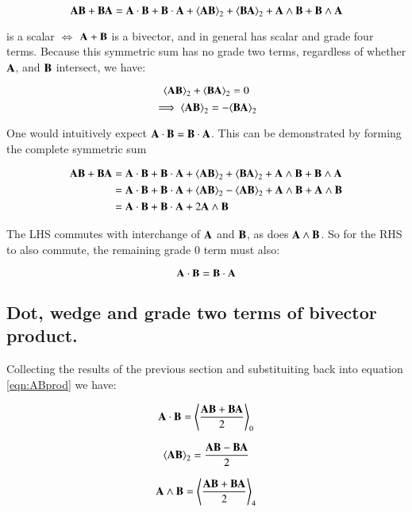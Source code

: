 \documentclass{article}      %
\newcommand{\gpgrade}[2] {{\left\langle{{#1}}\right\rangle}_{#2}}
\newcommand{\gpgradetwo}[1] {\gpgrade{#1}{2}}
\begin{document}
\[
\BA \BB + \BB \BA = 
\BA \cdot \BB + \BB \cdot \BA
+\gpgradetwo{\BA \BB} + \gpgradetwo{\BB \BA}
+\BA \wedge \BB + \BB \wedge \BA
\]

is a scalar $\iff$ 
$\mathbf{A} + \mathbf{B}$ is a bivector, and in general has scalar and grade four terms.
Because this symmetric sum has no grade two terms, 
regardless of whether $\mathbf{A}$, and $\mathbf{B}$ intersect, we have:

\[
\gpgradetwo{\BA \BB} + \gpgradetwo{\BB \BA} = 0
\]
\begin{equation}\label{eqn:signgradetwo}
\implies
\gpgradetwo{\BA \BB} = -\gpgradetwo{\BB \BA}
\end{equation}

One would intuitively expect $\mathbf{A} \cdot \mathbf{B} = \mathbf{B} \cdot \mathbf{A}$.  This can be
demonstrated by forming the complete symmetric sum

\begin{align*}
\BA \BB + \BB \BA 
&= 
{\BA \cdot \BB} +{\BB \cdot \BA}
+\gpgrade{\BA \BB}{2} +\gpgrade{\BB \BA}{2}
+{\BA \wedge \BB} + {\BB \wedge \BA} \\
&= 
{\BA \cdot \BB} +{\BB \cdot \BA}
+\gpgrade{\BA \BB}{2} -\gpgrade{\BA \BB}{2}
+{\BA \wedge \BB} + {\BA \wedge \BB} \\
&= 
{\BA \cdot \BB} +{\BB \cdot \BA}
+2{\BA \wedge \BB} \\
\end{align*}

The LHS commutes with interchange of $\mathbf{A}$ and $\mathbf{B}$, as does
${\mathbf{A} \wedge \mathbf{B}}$.  So for the RHS to also commute, the remaining grade 0 term
must also:

\begin{equation}\label{eqn:dotsign}
\mathbf{A} \cdot \mathbf{B} = \mathbf{B} \cdot \mathbf{A}
\end{equation}

\subsection{ Dot, wedge and grade two terms of bivector product. }

Collecting the results of the previous section and substituiting back
into equation \ref{eqn:ABprod} we have:

\begin{equation}\label{eqn:AdotB}
\BA \cdot \BB = \gpgrade{\frac{\BA \BB + \BB\BA}{2}}{0}
\end{equation}

\begin{equation}\label{eqn:AtwoB}
\gpgradetwo{\BA \BB} = \frac{\BA \BB - \BB\BA}{2}
\end{equation}

\begin{equation}\label{eqn:AwedgeB}
\BA \wedge \BB = \gpgrade{\frac{\BA \BB + \BB\BA}{2}}{4}
\end{equation}
\end{document}
